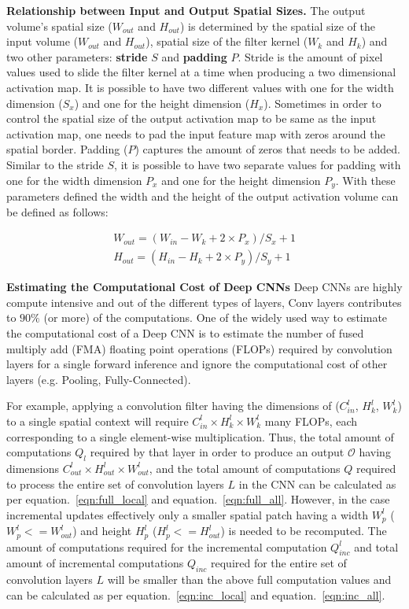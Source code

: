 \noindent \textbf{Relationship between Input and Output Spatial Sizes.} The output volume's spatial size ($W_{out}$ and $H_{out}$) is determined by the spatial size of the input volume ($W_{out}$ and $H_{out}$), spatial size of the filter kernel ($W_k$ and $H_k$) and two other parameters: \textbf{stride} $S$ and \textbf{padding} $P$. Stride is the amount of pixel values used to slide the filter kernel at a time when producing a two dimensional activation map. It is possible to have two different values with one for the width dimension ($S_x$) and one for the height dimension ($H_x$). Sometimes in order to control the spatial size of the output activation map to be same as the input activation map, one needs to pad the input feature map with zeros around the spatial border. Padding ($P$) captures the amount of zeros that needs to be added. Similar to the stride $S$, it is possible to have two separate values for padding with one for the width dimension $P_x$ and one for the height dimension $P_y$. With these parameters defined the width and the height of the output activation volume can be defined as follows:

\begin{align}
W_{out} = (W_{in} - W_k + 2\times P_x)/S_x + 1 \\
H_{out} = (H_{in} - H_k + 2\times P_y)/S_y + 1
\end{align}

\noindent \textbf{Estimating the Computational Cost of Deep CNNs}
Deep CNNs are highly compute intensive and out of the different types of layers, Conv layers contributes to $90\%$ (or more) of the computations. One of the widely used way to estimate the computational cost of a Deep CNN is to estimate the number of fused multiply add (FMA) floating point operations (FLOPs) required by convolution layers for a single forward inference and ignore the computational cost of other layers (e.g. Pooling, Fully-Connected).

For example, applying a convolution filter having the dimensions of ($C^l_{in}$, $H^l_{k}$, $W^l_{k}$) to a single spatial context will require $C^l_{in} \times H^l_{k} \times W^l_{k}$ many FLOPs, each corresponding to a single element-wise multiplication. Thus, the total amount of computations $Q_l$ required by that layer in order to produce an output $\mathcal{O}$ having dimensions $C^l_{out} \times H^l_{out} \times W^l_{out}$, and the total amount of computations $Q$ required to process the entire set of convolution layers $L$ in the CNN can be calculated as per equation.~\ref{eqn:full_local} and equation.~\ref{eqn:full_all}. However, in the case incremental updates effectively only a smaller spatial patch having a width $W^l_p$ ($W^l_p<=W^l_{out}$) and height $H^l_p$ ($H^l_p<=H^l_{out}$) is needed to be recomputed. The amount of computations required for the incremental computation $Q^l_{inc}$ and total amount of incremental computations $Q_{inc}$ required for the entire set of convolution layers $L$ will be smaller than the above full computation values and can be calculated as per equation.~\ref{eqn:inc_local} and equation.~\ref{eqn:inc_all}.

